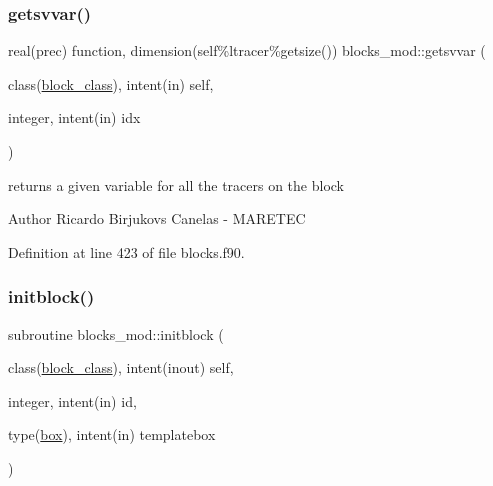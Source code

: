 \subsubsection{\texorpdfstring{getsvvar()}{getsvvar()}}
{\footnotesize\ttfamily real(prec) function, dimension(self\%ltracer\%getsize()) blocks\+\_\+mod\+::getsvvar (\begin{DoxyParamCaption}\item[{class(\mbox{\hyperlink{structblocks__mod_1_1block__class}{block\+\_\+class}}), intent(in)}]{self,  }\item[{integer, intent(in)}]{idx }\end{DoxyParamCaption})\hspace{0.3cm}{\ttfamily [private]}}



returns a given variable for all the tracers on the block 

\begin{DoxyAuthor}{Author}
Ricardo Birjukovs Canelas -\/ M\+A\+R\+E\+T\+EC 
\end{DoxyAuthor}


Definition at line 423 of file blocks.\+f90.


\mbox{\label{namespaceblocks__mod_a534ca69b17b6f54ee07f995b02feff39}} 
\subsubsection{\texorpdfstring{initblock()}{initblock()}}
{\footnotesize\ttfamily subroutine blocks\+\_\+mod\+::initblock (\begin{DoxyParamCaption}\item[{class(\mbox{\hyperlink{structblocks__mod_1_1block__class}{block\+\_\+class}}), intent(inout)}]{self,  }\item[{integer, intent(in)}]{id,  }\item[{type(\mbox{\hyperlink{structgeometry__mod_1_1box}{box}}), intent(in)}]{templatebox }\end{DoxyParamCaption})\hspace{0.3cm}{\ttfamily [private]}}




